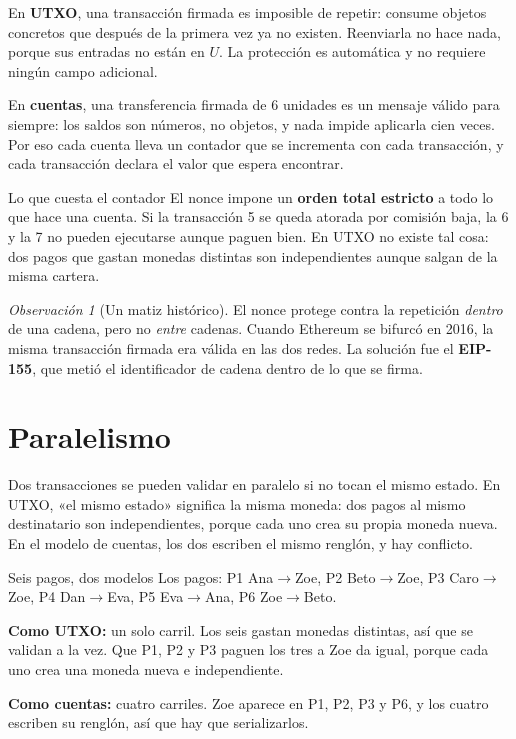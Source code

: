 \documentclass[11pt,a4paper]{article}
\theoremstyle{definition}
\theoremstyle{plain}
\theoremstyle{remark}
\newtheorem*{observacion}{Observación}
\begin{document}
En \textbf{UTXO}, una transacción firmada es imposible de repetir: consume
objetos concretos que después de la primera vez ya no existen. Reenviarla no hace
nada, porque sus entradas no están en $U$. La protección es automática y no
requiere ningún campo adicional.

En \textbf{cuentas}, una transferencia firmada de 6 unidades es un mensaje válido
para siempre: los saldos son números, no objetos, y nada impide aplicarla cien
veces. Por eso cada cuenta lleva un contador que se incrementa con cada
transacción, y cada transacción declara el valor que espera encontrar.

\begin{aviso}{Lo que cuesta el contador}
El nonce impone un \textbf{orden total estricto} a todo lo que hace una cuenta.
Si la transacción 5 se queda atorada por comisión baja, la 6 y la 7 no pueden
ejecutarse aunque paguen bien. En UTXO no existe tal cosa: dos pagos que gastan
monedas distintas son independientes aunque salgan de la misma cartera.
\end{aviso}

\begin{observacion}[Un matiz histórico]
El nonce protege contra la repetición \emph{dentro} de una cadena, pero no
\emph{entre} cadenas. Cuando Ethereum se bifurcó en 2016, la misma transacción
firmada era válida en las dos redes. La solución fue el \textbf{EIP-155}, que
metió el identificador de cadena dentro de lo que se firma.
\end{observacion}

\section{Paralelismo}\label{sec:paralelismo}

Dos transacciones se pueden validar en paralelo si no tocan el mismo estado. En
UTXO, «el mismo estado» significa la misma moneda: dos pagos al mismo
destinatario son independientes, porque cada uno crea su propia moneda nueva. En
el modelo de cuentas, los dos escriben el mismo renglón, y hay conflicto.

\begin{laboratorio}{Seis pagos, dos modelos}
Los pagos: P1 Ana$\to$Zoe, P2 Beto$\to$Zoe, P3 Caro$\to$Zoe, P4 Dan$\to$Eva,
P5 Eva$\to$Ana, P6 Zoe$\to$Beto.

\textbf{Como UTXO:} un solo carril. Los seis gastan monedas distintas, así que se
validan a la vez. Que P1, P2 y P3 paguen los tres a Zoe da igual, porque cada uno
crea una moneda nueva e independiente.

\textbf{Como cuentas:} cuatro carriles. Zoe aparece en P1, P2, P3 y P6, y los
cuatro escriben su renglón, así que hay que serializarlos.
\end{laboratorio}
\end{document}
